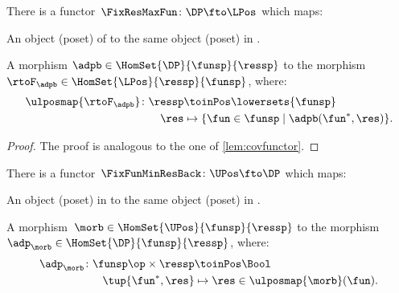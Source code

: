 \begin{lemma}
    \label{lem:confunctor}
    There is a functor~$\FixResMaxFun\colon \DP \fto \LPos$ which maps:
    \begin{compactenum}
        \item An object (poset) of \DP to the same object (poset) in \LPos.
        \item A morphism $\adpb \in \HomSet{\DP}{\funsp}{\ressp}$ to the morphism~$\rtoF_\adpb\in \HomSet{\LPos}{\ressp}{\funsp}$, where:
        \begin{equation*}
            \begin{aligned}
                \ulposmap{\rtoF_\adpb}\colon \ressp &\toinPos \lowersets{\funsp}\\
                \res&\mapsto \{ \fun \in \funsp \mid \adpb(\fun^*,\res)\}.
            \end{aligned}
        \end{equation*}
    \end{compactenum}
\end{lemma}

\begin{proof}
    The proof is analogous to the one of \cref{lem:covfunctor}.
\end{proof}


\begin{lemma}
    \label{lem:covfunctorback}
    There is a functor~$\FixFunMinResBack\colon \UPos \fto \DP$ which maps:
    \begin{compactenum}
        \item An object (poset) in \UPos to the same object (poset) in \DP.
        \item A morphism~$\morb\in \HomSet{\UPos}{\funsp}{\ressp}$ to the morphism~$\adp_\morb \in \HomSet{\DP}{\funsp}{\ressp}$, where:
        \begin{equation}
            \begin{aligned}
                \adp_\morb\colon \funsp\op \times \ressp &\toinPos \Bool\\
                \tup{\fun^*,\res}&\mapsto \res \in \ulposmap{\morb}(\fun).
            \end{aligned}
        \end{equation}
    \end{compactenum}
\end{lemma}

